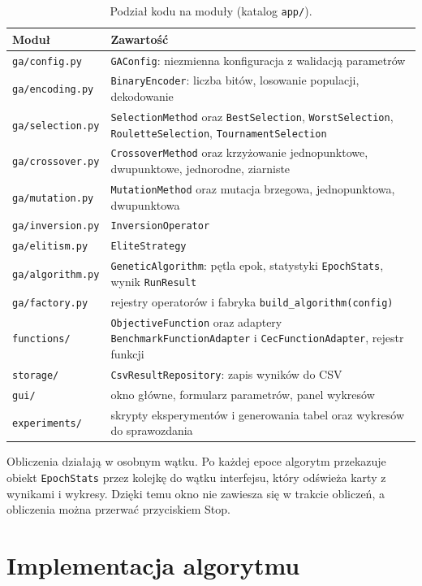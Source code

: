 \documentclass[11pt,a4paper]{article}
\begin{document}
\begin{table}[H]
\centering
\small
\begin{tabularx}{\textwidth}{lX}
\toprule
Moduł & Zawartość \\
\midrule
\texttt{ga/config.py} & \texttt{GAConfig}: niezmienna konfiguracja z walidacją parametrów \\
\texttt{ga/encoding.py} & \texttt{BinaryEncoder}: liczba bitów, losowanie populacji, dekodowanie \\
\texttt{ga/selection.py} & \texttt{SelectionMethod} oraz \texttt{BestSelection}, \texttt{WorstSelection}, \texttt{RouletteSelection}, \texttt{TournamentSelection} \\
\texttt{ga/crossover.py} & \texttt{CrossoverMethod} oraz krzyżowanie jednopunktowe, dwupunktowe, jednorodne, ziarniste \\
\texttt{ga/mutation.py} & \texttt{MutationMethod} oraz mutacja brzegowa, jednopunktowa, dwupunktowa \\
\texttt{ga/inversion.py} & \texttt{InversionOperator} \\
\texttt{ga/elitism.py} & \texttt{EliteStrategy} \\
\texttt{ga/algorithm.py} & \texttt{GeneticAlgorithm}: pętla epok, statystyki \texttt{EpochStats}, wynik \texttt{RunResult} \\
\texttt{ga/factory.py} & rejestry operatorów i fabryka \texttt{build\_algorithm(config)} \\
\texttt{functions/} & \texttt{ObjectiveFunction} oraz adaptery \texttt{BenchmarkFunctionAdapter} i \texttt{CecFunctionAdapter}, rejestr funkcji \\
\texttt{storage/} & \texttt{CsvResultRepository}: zapis wyników do CSV \\
\texttt{gui/} & okno główne, formularz parametrów, panel wykresów \\
\texttt{experiments/} & skrypty eksperymentów i generowania tabel oraz wykresów do sprawozdania \\
\bottomrule
\end{tabularx}
\caption{Podział kodu na moduły (katalog \texttt{app/}).}
\end{table}

Obliczenia działają w osobnym wątku. Po każdej epoce algorytm przekazuje obiekt \texttt{EpochStats}
przez kolejkę do wątku interfejsu, który odświeża karty z wynikami i wykresy. Dzięki temu okno
nie zawiesza się w trakcie obliczeń, a obliczenia można przerwać przyciskiem Stop.

\section{Implementacja algorytmu}
\end{document}
